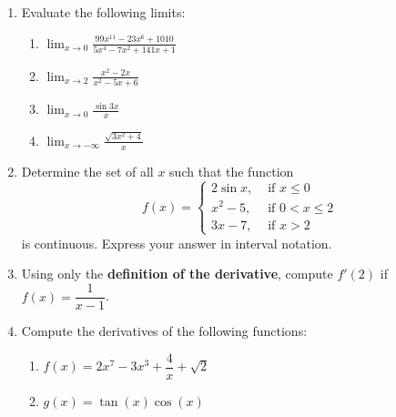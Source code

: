 \documentclass[12pt]{article}
\newcommand{\points}[1]{\marginpar{\hspace{24pt}[#1]}}
\newcommand{\ds}{\displaystyle}
\begin{document}
\begin{enumerate}
 \item Evaluate the following limits:
\begin{enumerate}
\item $\ds \lim_{x\to 0}\frac{99x^{11}-23x^6+1010}{5x^4-7x^2+141x+1}$ \points{2}

\vspace{1.25in} 

\item $\ds \lim_{x\to 2}\frac{x^2-2x}{x^2-5x+6}$ \points{2}

\vspace{1.75in}

 \item $\ds \lim_{x\to 0}\frac{\sin 3x}{x}$ \points{3}

\vspace{2in}

 \item $\ds \lim_{x\to -\infty}\frac{\sqrt{3x^2+4}}{x}$ \points{3}
\end{enumerate}
\newpage

\item Determine the set of all $x$ such that the function \points{5}
\[
 f(x) = \begin{cases}
         2\sin x, & \text{ if } x\leq 0\\
         x^2-5, & \text{ if } 0<x\leq 2\\
         3x-7, & \text{ if } x>2
        \end{cases}
\]
is continuous. Express your answer in interval notation.

\vspace{3.5in}

\item Using only the {\bf definition of the derivative}, compute $f'(2)$ if $f(x) = \dfrac{1}{x-1}$. \points{5}


\newpage

\item Compute the derivatives of the following functions:
\begin{enumerate}
 \item $f(x) = 2x^7-3x^3+\dfrac{4}{x}+\sqrt{2}$ \points{2}

\vspace{1in}

 \item $g(x) = \tan (x)\cos(x)$ \points{2}

\vspace{1in}


\end{enumerate}
\end{enumerate}
\end{document}
